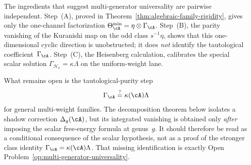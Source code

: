 \begin{remark}%
\label{rem:multi-gen-independence}%
The ingredients that suggest multi-generator universality are
pairwise independent.
Step~(A), proved in
Theorem~\ref{thm:algebraic-family-rigidity}, gives only the
one-channel factorization
$\Theta_{\cA}^{\min}=\eta\otimes\Gamma_{\cA}$.
Step~(B), the parity vanishing of the Kuranishi map on the odd
class $s^{-1}\eta$, shows that this one-dimensional cyclic
direction is unobstructed; it does \emph{not} identify the
tautological coefficient~$\Gamma_{\cA}$.
Step~(C), the Heisenberg calculation, calibrates the special
scalar solution
$\Gamma_{\mathcal{H}_\kappa}=\kappa\Lambda$ on the uniform-weight
lane.

What remains open is the tautological-purity step
\[
\Gamma_{\cA}
\stackrel{?}{=}
\kappa(\cA)\Lambda
\]
for general multi-weight families.
The decomposition theorem below isolates a shadow correction
$\Delta_g(\cA)$, but its integrated vanishing is obtained only
\emph{after} imposing the scalar free-energy formula at genus~$g$.
It should therefore be read as a conditional consequence of the
scalar hypothesis, not as a proof of the stronger class identity
$\Gamma_{\cA}=\kappa(\cA)\Lambda$.
That missing identification is exactly
Open Problem~\textup{\ref{op:multi-generator-universality}}.
\end{remark}

